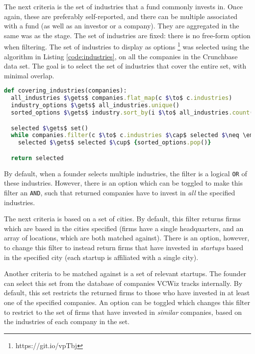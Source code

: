 The next criteria is the set of industries that a fund commonly invests in. Once again, these are preferably self-reported, and there can be multiple associated with a fund (as well as an investor or a company). They are aggregated in the same was as the stage. The set of industries are fixed: there is no free-form option when filtering. The set of industries to display as options \footnote{https://git.io/vpTbj} was selected using the algorithm in Listing \ref{code:industries}, on all the companies in the Crunchbase data set. The goal is to select the set of industries that cover the entire set, with minimal overlap.

\begin{lstlisting}[float,frame=single,mathescape=true,language=Ruby,basicstyle=\footnotesize,columns=fullflexible,caption={Display Industries},label={code:industries}]
def covering_industries(companies):
  all_industries $\gets$ companies.flat_map(c $\to$ c.industries)
  industry_options $\gets$ all_industries.unique()
  sorted_options $\gets$ industry.sort_by(i $\to$ all_industries.count(i))

  selected $\gets$ set()
  while companies.filter(c $\to$ c.industries $\cap$ selected $\neq \emptyset$).count() > 0:
    selected $\gets$ selected $\cup$ {sorted_options.pop()}

  return selected
\end{lstlisting}

By default, when a founder selects multiple industries, the filter is a logical \texttt{OR} of these industries. However, there is an option which can be toggled to make this filter an \texttt{AND}, such that returned companies have to invest in \textit{all} the specified industries.

The next criteria is based on a set of cities. By default, this filter returns firms which are based in the cities specified (firms have a single headquarters, and an array of locations, which are both matched against). There is an option, however, to change this filter to instead return firms that have invested in \textit{startups} based in the specified city (each startup is affiliated with a single city).

Another criteria to be matched against is a set of relevant startups. The founder can select this set from the database of companies VCWiz tracks internally. By default, this set restricts the returned firms to those who have invested in at least one of the specified companies. An option can be toggled which changes this filter to restrict to the set of firms that have invested in \textit{similar} companies, based on the industries of each company in the set.

